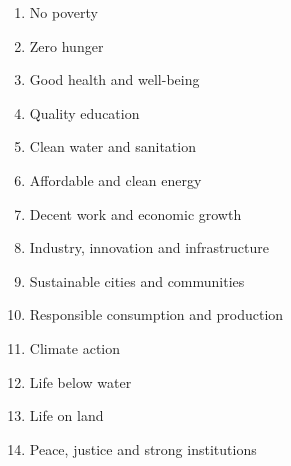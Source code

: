 \documentclass[a4paper, 11pt, oneside]{uet_thesis}  %
\begin{document}
\begin{enumerate}[itemsep=0em]
	\item No poverty
	\item Zero hunger
	\item Good health and well-being
	\item Quality education
	\item Clean water and sanitation
	\item Affordable and clean energy
	\item Decent work and economic growth
	\item Industry, innovation and infrastructure
	\item Sustainable cities and communities
	\item Responsible consumption and production
	\item Climate action
	\item Life below water
	\item Life on land
	\item Peace, justice and strong institutions
\end{enumerate}

\clearpage	%

\pagestyle{fancy}  %

\tableofcontents  %

\listoffigures  %

\listoftables  %
\end{document}
